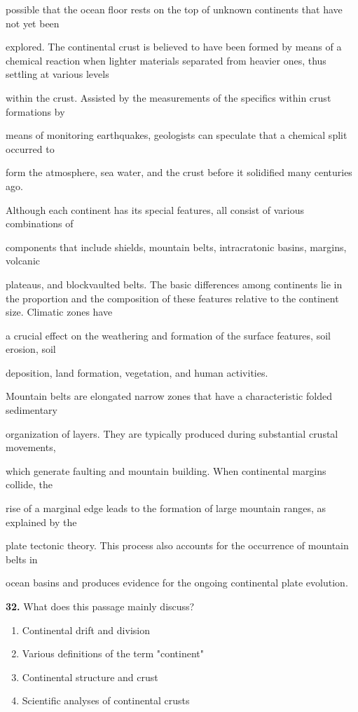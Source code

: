 \documentclass[12pt]{article}
\begin{document}
possible that the ocean floor rests on the top of unknown continents that have not yet been\par
explored. The continental crust is believed to have been formed by means of a chemical reaction when lighter materials separated from heavier ones, thus settling at various levels\par
within the crust. Assisted by the measurements of the specifics within crust formations by\par
means of monitoring earthquakes, geologists can speculate that a chemical split occurred to\par
form the atmosphere, sea water, and the crust before it solidified many centuries ago.\par
Although each continent has its special features, all consist of various combinations of\par
components that include shields, mountain belts, intracratonic basins, margins, volcanic\par
plateaus, and blockvaulted belts. The basic differences among continents lie in the proportion and the composition of these features relative to the continent size. Climatic zones have\par
a crucial effect on the weathering and formation of the surface features, soil erosion, soil\par
deposition, land formation, vegetation, and human activities.\par
Mountain belts are elongated narrow zones that have a characteristic folded sedimentary\par
organization of layers. They are typically produced during substantial crustal movements,\par
which generate faulting and mountain building. When continental margins collide, the\par
rise of a marginal edge leads to the formation of large mountain ranges, as explained by the\par
plate tectonic theory. This process also accounts for the occurrence of mountain belts in\par
ocean basins and produces evidence for the ongoing continental plate evolution.\par
\endgroup
\medskip
\noindent\textbf{32.} What does this passage mainly discuss?
\begin{enumerate}[label=(\Alph*),leftmargin=*,itemsep=0.2em]
\item Continental drift and division
\item Various definitions of the term "continent"
\item Continental structure and crust
\item Scientific analyses of continental crusts
\end{enumerate}
\end{document}

